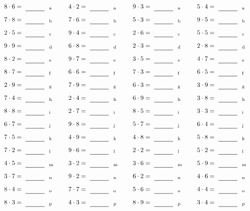 \documentclass
[
  draft    = true,
  fontsize = 11pt,
  parskip  = half-
]
{scrartcl}
\begin{document}
\par\vfill\par
\begin{align*}
    \pline{8\cdot6}&=\rline{a}
  & \pline{4\cdot2}&=\rline{a}
  & \pline{9\cdot3}&=\rline{a}
  & \pline{5\cdot4}&=\rline{a} \\[1ex]
    \pline{7\cdot8}&=\rline{b}
  & \pline{7\cdot6}&=\rline{b}
  & \pline{5\cdot3}&=\rline{b}
  & \pline{9\cdot5}&=\rline{b} \\[1ex]
    \pline{2\cdot5}&=\rline{c}
  & \pline{9\cdot4}&=\rline{c}
  & \pline{2\cdot6}&=\rline{c}
  & \pline{5\cdot5}&=\rline{c} \\[1ex]
    \pline{9\cdot9}&=\rline{d}
  & \pline{6\cdot8}&=\rline{d}
  & \pline{2\cdot3}&=\rline{d}
  & \pline{2\cdot8}&=\rline{d} \\[1ex]
    \pline{8\cdot2}&=\rline{e}
  & \pline{9\cdot7}&=\rline{e}
  & \pline{3\cdot5}&=\rline{e}
  & \pline{4\cdot7}&=\rline{e} \\[1ex]
    \pline{8\cdot7}&=\rline{f}
  & \pline{6\cdot6}&=\rline{f}
  & \pline{7\cdot3}&=\rline{f}
  & \pline{6\cdot5}&=\rline{f} \\[1ex]
    \pline{2\cdot9}&=\rline{g}
  & \pline{7\cdot9}&=\rline{g}
  & \pline{6\cdot3}&=\rline{g}
  & \pline{3\cdot9}&=\rline{g} \\[1ex]
    \pline{7\cdot4}&=\rline{h}
  & \pline{2\cdot4}&=\rline{h}
  & \pline{6\cdot9}&=\rline{h}
  & \pline{3\cdot8}&=\rline{h} \\[1ex]
    \pline{8\cdot8}&=\rline{i}
  & \pline{2\cdot7}&=\rline{i}
  & \pline{8\cdot5}&=\rline{i}
  & \pline{3\cdot3}&=\rline{i} \\[1ex]
    \pline{6\cdot7}&=\rline{j}
  & \pline{9\cdot8}&=\rline{j}
  & \pline{5\cdot7}&=\rline{j}
  & \pline{6\cdot4}&=\rline{j} \\[1ex]
    \pline{7\cdot5}&=\rline{k}
  & \pline{4\cdot9}&=\rline{k}
  & \pline{4\cdot8}&=\rline{k}
  & \pline{5\cdot8}&=\rline{k} \\[1ex]
    \pline{7\cdot2}&=\rline{l}
  & \pline{9\cdot6}&=\rline{l}
  & \pline{2\cdot2}&=\rline{l}
  & \pline{5\cdot2}&=\rline{l} \\[1ex]
    \pline{4\cdot5}&=\rline{m}
  & \pline{3\cdot2}&=\rline{m}
  & \pline{3\cdot6}&=\rline{m}
  & \pline{5\cdot9}&=\rline{m} \\[1ex]
    \pline{3\cdot7}&=\rline{n}
  & \pline{9\cdot2}&=\rline{n}
  & \pline{6\cdot2}&=\rline{n}
  & \pline{4\cdot6}&=\rline{n} \\[1ex]
    \pline{8\cdot4}&=\rline{o}
  & \pline{7\cdot7}&=\rline{o}
  & \pline{5\cdot6}&=\rline{o}
  & \pline{4\cdot4}&=\rline{o} \\[1ex]
    \pline{8\cdot3}&=\rline{p}
  & \pline{4\cdot3}&=\rline{p}
  & \pline{8\cdot9}&=\rline{p}
  & \pline{3\cdot4}&=\rline{p}
\end{align*}
\end{document}
